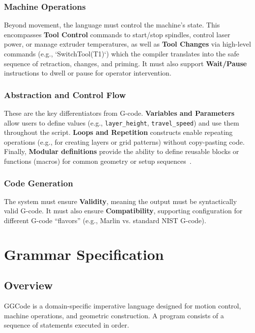 \subsection{Machine Operations}
Beyond movement, the language must control the machine's state. This encompasses \textbf{Tool Control} commands to start/stop spindles, control laser power, or manage extruder temperatures, as well as \textbf{Tool Changes} via high-level commands (e.g., `SwitchTool(T1)`) which the compiler translates into the safe sequence of retraction, changes, and priming. It must also support \textbf{Wait/Pause} instructions to dwell or pause for operator intervention.

\subsection{Abstraction and Control Flow}
These are the key differentiators from G-code. \textbf{Variables and Parameters} allow users to define values (e.g., \texttt{layer\_height}, \texttt{travel\_speed}) and use them throughout the script. \textbf{Loops and Repetition} constructs enable repeating operations (e.g., for creating layers or grid patterns) without copy-pasting code. Finally, \textbf{Modular definitions} provide the ability to define reusable blocks or functions (macros) for common geometry or setup sequences~\cite{arroyo_generating_2011}.

\subsection{Code Generation}
The system must ensure \textbf{Validity}, meaning the output must be syntactically valid G-code. It must also ensure \textbf{Compatibility}, supporting configuration for different G-code ``flavors'' (e.g., Marlin vs. standard NIST G-code).


\chapter{Grammar Specification}

\section{Overview}

GGCode is a domain-specific imperative language designed for motion control, machine operations, and geometric construction. A program consists of a sequence of statements executed in order.


